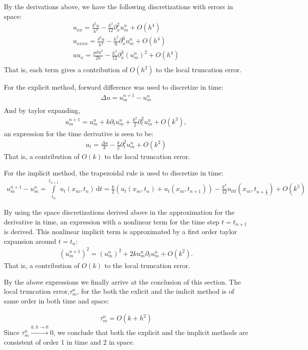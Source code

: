 By the derivations above, we have the following discretizations with errors in space:
\begin{align*}
u_{xx} = \frac{\delta^2 u}{h^2} - \frac{h^2}{12}\partial_{x}^2u_m^n + O(h^4) \\
u_{xxxx} = \frac{\delta^4 u}{h^4} - \frac{h^2}{6}\partial_{x}^6u_m^n + O(h^4) \\
uu_{x} = \frac{\mu \delta u^2}{2h} - \frac{h^2}{12}\partial_{x}^3(u_m^n)^2 + O(h^4) \\
\end{align*}
That is, each term gives a contribution of $O(h^2)$ to the local truncation error.

For the explicit method, forward difference was used to discretize in time:
\begin{align*}
\Delta u = u_m^{n+1}-u_m^n \\
\end{align*}
And by taylor expanding,
\begin{align*}
u_m^{n+1} = u_m^n + k\partial_tu_m^n + \frac{k^2}{2}\partial_t^2u_m^n + O(k^3),
\end{align*}
an expression for the time derivative is seen to be:
\begin{align*}
u_t = \frac{\Delta u}{k} - \frac{k}{2}\partial_t^2u_m^n + O(k^2)
\end{align*}
That is, a contribution of $O(k)$ to the local truncation error.

For the implicit method, the trapezoidal rule is used to discretize in time:
\begin{align*}
u_{m}^{n+1} - u_m^n = \int\limits_{t_{n}}^{t_{n+1}} u_{t}(x_{m},t_{n})\, \mathrm{d}t = \frac{k}{2}(u_t(x_m,t_n) + u_t(x_m,t_{n+1})) - \frac{k^3}{12}u_{ttt}(x_m,t_{n+\frac{1}{2}}) + O(k^5)
\end{align*}

By using the space discretizations derived above in the approximation for the derivative in time, an expression with a nonlinear term for the time step $t=t_{n+1}$ is derived. This nonlinear implicit term is approximated by a first order taylor expansion around $t=t_{n}$:
\begin{align*}
(u_m^{n+1})^2 = (u_m^n)^2 + 2ku_m^n\partial_tu_m^n + O(k^2).
\end{align*}
That is, a contribution of $O(k)$ to the local truncation error.

By the above expressions we finally arrive at the conclusion of this section. The local truncation error,$\tau_m^n$, for the both the exlicit and the imlicit method is of same order in both time and space:

\begin{align*}
\tau_m^n = O(k + h^2)
\end{align*}
Since $\tau_m^n \xrightarrow{k,h \to 0} 0$, we conclude that both the explicit and the implicit methods are consistent of order 1 in time and 2 in space.

